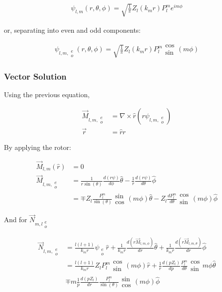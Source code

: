         \begin{align}
            \psi_{l,m}(r, \theta, \phi) = \sqrt{\frac{1}{\pi}}Z_l(k_m r)P_l^m e^{im\phi}
        \end{align}

        or, separating into even and odd components:

        \begin{align}
            \psi_{l,m,\substack{e\\ o}}(r, \theta, \phi) = \sqrt{\frac{1}{\pi}}Z_l(k_m r)P_l^m \substack{\cos\\\sin}(m\phi)
        \end{align}

    \subsubsection{Vector Solution}

        Using the previous equation,

        \begin{align}
            \vec{M}_{l,m, \substack{e \\ o}} &= \nabla \times \hat{r}(r \psi_{l, m, \substack{e \\ o }})\\
            \vec{r} &= \hat{r}r
        \end{align}

        By applying the rotor:

        \begin{align}
            \vec{M}_{l,m}(\hat{r}) &= 0 \\
            \vec{M}_{l,m, \substack{e \\ o}} &= \frac{1}{r\sin(\theta)}\frac{d(r\psi)}{d\phi}\hat{\theta} - \frac{1}{r}\frac{d(r\psi)}{d\theta}\hat{\phi} \\
            &= \mp Z_l\frac{P^m_l}{\sin(\theta)}\substack{\sin \\\cos}(m\phi)\hat{\theta} - Z_l\frac{dP^m_l}{d\theta}\substack{\cos \\ \sin}(m\phi)\hat{\phi}
        \end{align}

        And for $\vec{N}_{m,l\substack{e\\ o}}$

        \begin{align}
            \vec{N}_{l,m,\substack{e\\ o}} &= \frac{l(l+1)}{k_mr}\psi_{\substack{e\\ o}}\hat{r}
                + \frac{1}{k_mr}\frac{d(r\vec{M}_{l,m,\phi})}{dr} \hat{\theta} + \frac{1}{k_m r}\frac{d(r\vec{M}_{l,m,\theta})}{dr}\hat{\phi} \\
            &= \frac{l(l+1)}{k_mr}Z_l P_l^m \substack{\cos\\\sin}(m\phi) \hat{r}
                + \frac{1}{r}\frac{d(pZ_l)}{dp}\frac{P_l^m}{d\theta}\substack{\cos\\\sin}m\phi\hat{\theta}  \\
            &\mp m\frac{1}{p}\frac{d(pZ_l)}{dr}\frac{P_l^m}{\sin(\theta)}\substack{\sin\\\cos}(m\phi)\hat{\phi}
        \end{align}

